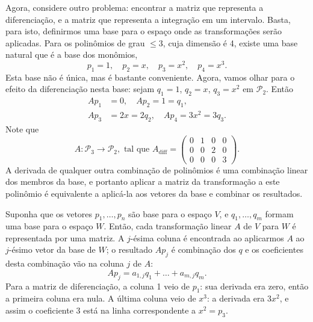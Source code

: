 Agora, considere outro problema: encontrar a matriz que representa a diferenciação, e a matriz que representa a integração em um intervalo. Basta, para isto, definirmos uma base para o espaço onde as transformações serão aplicadas. Para os polinômios de grau $\leq 3$, cuja dimensão é 4, existe uma base natural que é a base dos monômios,
\begin{equation*}
  p_1=1, \quad p_2=x, \quad p_3=x^2, \quad p_4=x^3.
\end{equation*}
Esta base não é única, mas é bastante conveniente. Agora, vamos olhar para o efeito da diferenciação nesta base: sejam $q_1 = 1$, $q_2 = x$, $q_3 = x^2$ em ${\mathcal{P}}_2$. Então
\begin{align*}
  Ap_1&=0, \quad Ap_2 = 1=q_1, \\ 
  Ap_3&=2x = 2q_2, \quad Ap_4 = 3x^2=3q_3.
\end{align*}
Note que 
\begin{equation*}
   A : {\mathcal{P}}_3 \rightarrow {\mathcal{P}}_2, \mbox{ tal que } A_{\text{diff}} =
      \begin{pmatrix}
         0 & 1 & 0 & 0\\
         0 & 0 & 2 & 0\\
         0 & 0 & 0 & 3
      \end{pmatrix}.
\end{equation*}
A derivada de qualquer outra combinação de polinômios é uma combinação linear dos membros da base, e portanto aplicar a matriz da transformação a este polinômio é equivalente a aplicá-la aos vetores da base e combinar os resultados.

Suponha que os vetores $p_1,\ldots,p_n$ são base para o espaço $V$, e $q_1,\ldots,q_m$ formam uma base para o espaço $W$. Então, cada transformação linear $A$ de $V$ para $W$ é representada por uma matriz. A $j$-ésima coluna é encontrada ao aplicarmos $A$ ao $j$-ésimo vetor da base de $W$; o resultado $Ap_j$ é combinação dos $q$ e os coeficientes desta combinação vão na coluna $j$ de $A$:
\begin{equation*}
  Ap_j = a_{1,j}q_1+\ldots+a_{m,j}q_m.
\end{equation*}
Para a matriz de diferenciação, a coluna 1 veio de $p_1$: sua derivada era zero, então a primeira coluna era nula. A última coluna veio de $x^3$: a derivada era $3x^2$, e assim o coeficiente 3 está na linha correspondente a $x^2=p_3$.

